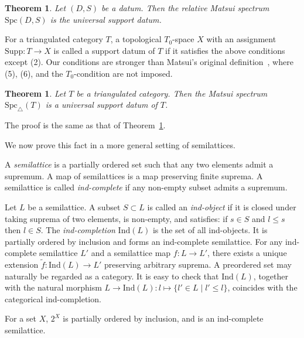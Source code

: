 \documentclass[11pt]{amsart}
\theoremstyle{definition}
\theoremstyle{plain}
\newtheorem{thm}[defn]{Theorem}
\theoremstyle{remark}
\newcommand{\Ind}{\mathrm{Ind}}
\newcommand{\Supp}{\mathrm{Supp}}
\newcommand{\Spc}{\mathrm{Spc}}
\newcommand{\tSpc}{\mathrm{Spc}_{\triangle}}
\numberwithin{equation}{section}
\begin{document}
\begin{thm}\label{thm:universality_of_matsui_spectra}
  Let \((D,S)\) be a datum.
  Then the relative Matsui spectrum \(\Spc (D,S)\) is the universal support datum.
\end{thm}

For a triangulated category \(T\), a topological \(T_0\)-space \(X\) with an assignment \(\Supp:T\to X\) is called a support datum of \(T\) if it satisfies the above conditions except (2).
Our conditions are stronger than Matsui's original definition~\cite{Ma1}, where (5), (6), and the \(T_0\)-condition are not imposed.

\begin{thm}
Let \(T\) be a triangulated category.
Then the Matsui spectrum \(\tSpc(T)\) is a universal support datum of \(T\).
\end{thm}
The proof is the same as that of Theorem~\ref{thm:universality_of_matsui_spectra}.

\medskip

We now prove this fact in a more general setting of semilattices.

A \emph{semilattice} is a partially ordered set such that any two elements admit a supremum.
A map of semilattices is a map preserving finite suprema.
A semilattice is called \emph{ind-complete} if any non-empty subset admits a supremum.

Let \(L\) be a semilattice.
A subset \(S\subset L\) is called an \emph{ind-object} if it is closed under taking suprema of two elements, is non-empty, and satisfies: if \(s\in S\) and \(l\le s\) then \(l\in S\).
The \emph{ind-completion} \(\Ind(L)\) is the set of all ind-objects.
It is partially ordered by inclusion and forms an ind-complete semilattice.
For any ind-complete semilattice \(L'\) and a semilattice map \(f:L\to L'\), there exists a unique extension \(\tilde{f}:\Ind(L)\to L'\) preserving arbitrary suprema.
A preordered set may naturally be regarded as a category.
It is easy to check that \(\Ind(L)\), together with the natural morphism \(L\to \Ind(L): l\mapsto \{l'\in L\mid l'\le l\}\), coincides with the categorical ind-completion.

For a set \(X\), \(2^X\) is partially ordered by inclusion, and is an ind-complete semilattice.
\end{document}

